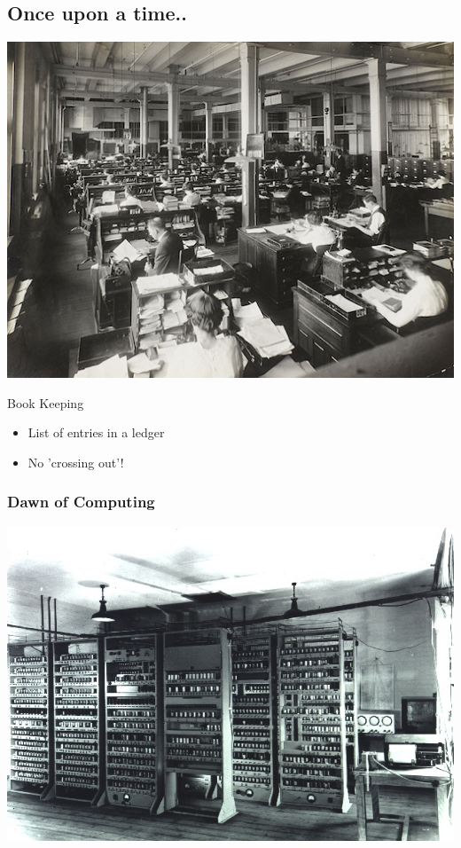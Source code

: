 \documentclass[11pt]{article}
\begin{document}
\subsection*{Once upon a time..}
\label{sec:orgheadline8}

\includegraphics[width=.9\linewidth]{./book-keepers.jpg}

Book Keeping
\begin{itemize}
\item List of entries in a ledger
\end{itemize}
\begin{itemize}
\item No 'crossing out'!
\end{itemize}

\subsubsection*{Dawn of Computing}
\label{sec:orgheadline5}

\includegraphics[width=.9\linewidth]{./EDSAC.jpg}
\end{document}
